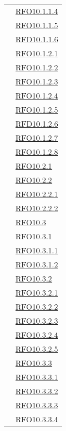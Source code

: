 \begin{longtable}{|>{\centering}m{5cm}|m{5cm}<{\centering}|}
& \hyperlink{RFO10.1.1.4}{RFO10.1.1.4}\\
& \hyperlink{RFO10.1.1.5}{RFO10.1.1.5}\\
& \hyperlink{RFD10.1.1.6}{RFD10.1.1.6}\\
& \hyperlink{RFO10.1.2.1}{RFO10.1.2.1}\\
& \hyperlink{RFO10.1.2.2}{RFO10.1.2.2}\\
& \hyperlink{RFO10.1.2.3}{RFO10.1.2.3}\\
& \hyperlink{RFO10.1.2.4}{RFO10.1.2.4}\\
& \hyperlink{RFO10.1.2.5}{RFO10.1.2.5}\\
& \hyperlink{RFD10.1.2.6}{RFD10.1.2.6}\\
& \hyperlink{RFO10.1.2.7}{RFO10.1.2.7}\\
& \hyperlink{RFO10.1.2.8}{RFO10.1.2.8}\\
& \hyperlink{RFO10.2.1}{RFO10.2.1}\\
& \hyperlink{RFO10.2.2}{RFO10.2.2}\\
& \hyperlink{RFO10.2.2.1}{RFO10.2.2.1}\\
& \hyperlink{RFO10.2.2.2}{RFO10.2.2.2}\\
& \hyperlink{RFO10.3}{RFO10.3}\\
& \hyperlink{RFO10.3.1}{RFO10.3.1}\\
& \hyperlink{RFO10.3.1.1}{RFO10.3.1.1}\\
& \hyperlink{RFO10.3.1.2}{RFO10.3.1.2}\\
& \hyperlink{RFO10.3.2}{RFO10.3.2}\\
& \hyperlink{RFO10.3.2.1}{RFO10.3.2.1}\\
& \hyperlink{RFO10.3.2.2}{RFO10.3.2.2}\\
& \hyperlink{RFO10.3.2.3}{RFO10.3.2.3}\\
& \hyperlink{RFO10.3.2.4}{RFO10.3.2.4}\\
& \hyperlink{RFO10.3.2.5}{RFO10.3.2.5}\\
& \hyperlink{RFO10.3.3}{RFO10.3.3}\\
& \hyperlink{RFO10.3.3.1}{RFO10.3.3.1}\\
& \hyperlink{RFO10.3.3.2}{RFO10.3.3.2}\\
& \hyperlink{RFO10.3.3.3}{RFO10.3.3.3}\\
& \hyperlink{RFO10.3.3.4}{RFO10.3.3.4}\\


\end{longtable}
